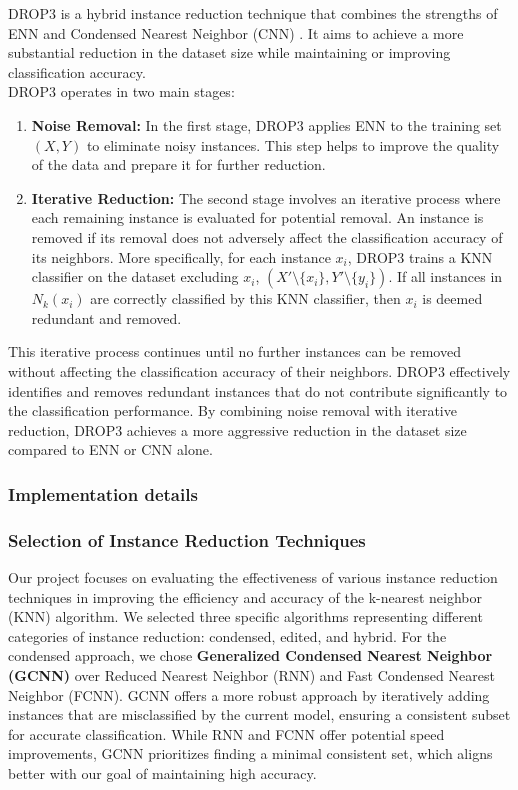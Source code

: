 DROP3 is a hybrid instance reduction technique that combines the strengths of ENN and 
Condensed Nearest Neighbor (CNN) \cite{Wilson2000}. It aims to achieve a more substantial reduction in the dataset size while 
maintaining or improving classification accuracy.\\

DROP3 operates in two main stages:

\begin{enumerate}
    \item \textbf{Noise Removal:} In the first stage, DROP3 applies ENN to the training set $(X, Y)$ to eliminate noisy instances. This step helps to improve the quality of the data and prepare it for further reduction. 
    \item \textbf{Iterative Reduction:} The second stage involves an iterative process where each remaining instance is evaluated for potential removal. An instance is removed if its removal does not adversely affect the classification accuracy of its neighbors.  More specifically, for each instance $x_i$, DROP3 trains a KNN classifier on the dataset excluding $x_i$, $(X' \setminus \{x_i\}, Y' \setminus \{y_i\})$. If all instances in $N_k(x_i)$ are correctly classified by this KNN classifier, then $x_i$ is deemed redundant and removed.
\end{enumerate}

This iterative process continues until no further instances can be removed without affecting the classification accuracy of their neighbors. DROP3 effectively identifies and removes redundant instances that do not contribute significantly to the classification performance. By combining noise removal with iterative reduction, DROP3 achieves a more aggressive reduction in the dataset size compared to ENN or CNN alone.


\subsubsection{Implementation details}


\subsubsection*{Selection of Instance Reduction Techniques}
Our project focuses on evaluating the effectiveness of various instance reduction techniques in improving
the efficiency and accuracy of the k-nearest neighbor (KNN) algorithm.  We selected three specific algorithms
representing different categories of instance reduction: condensed, edited, and hybrid. For the condensed approach,
we chose \textbf{Generalized Condensed Nearest Neighbor (GCNN)} over Reduced Nearest Neighbor (RNN) and Fast Condensed Nearest Neighbor (FCNN). 
GCNN offers a more robust approach by iteratively adding instances that are misclassified by the current model,
ensuring a consistent subset for accurate classification. While RNN and FCNN offer potential speed improvements,
GCNN prioritizes finding a minimal consistent set, which aligns better with our goal of maintaining high accuracy.

